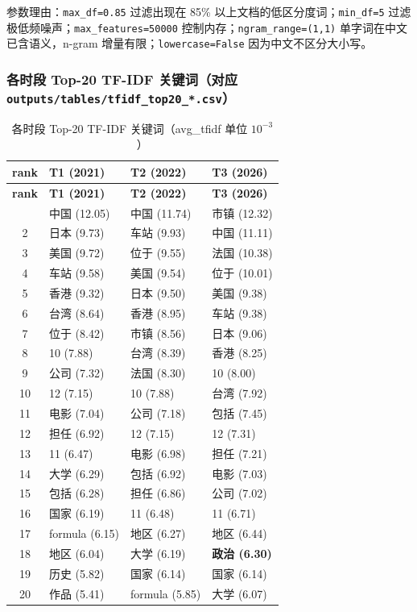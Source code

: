 \documentclass[12pt,a4paper]{article}
\begin{document}
参数理由：\texttt{max\_df=0.85} 过滤出现在 85\% 以上文档的低区分度词；\texttt{min\_df=5} 过滤极低频噪声；\texttt{max\_features=50000} 控制内存；\texttt{ngram\_range=(1,1)} 单字词在中文已含语义，n-gram 增量有限；\texttt{lowercase=False} 因为中文不区分大小写。

\subsubsection*{各时段 Top-20 TF-IDF 关键词（对应 \texttt{outputs/tables/tfidf\_top20\_*.csv}）}

\begin{longtable}{|c|l|l|l|}
\caption{各时段 Top-20 TF-IDF 关键词（avg\_tfidf 单位 $10^{-3}$）} \\
\hline
\textbf{rank} & \textbf{T1 (2021)} & \textbf{T2 (2022)} & \textbf{T3 (2026)} \\
\hline
\endfirsthead
\hline
\textbf{rank} & \textbf{T1 (2021)} & \textbf{T2 (2022)} & \textbf{T3 (2026)} \\
\hline
\endhead
\hline
\endfoot
1  & 中国 (12.05) & 中国 (11.74) & 市镇 (12.32) \\
2  & 日本 (9.73)  & 车站 (9.93)  & 中国 (11.11) \\
3  & 美国 (9.72)  & 位于 (9.55)  & 法国 (10.38) \\
4  & 车站 (9.58)  & 美国 (9.54)  & 位于 (10.01) \\
5  & 香港 (9.32)  & 日本 (9.50)  & 美国 (9.38) \\
6  & 台湾 (8.64)  & 香港 (8.95)  & 车站 (9.38) \\
7  & 位于 (8.42)  & 市镇 (8.56)  & 日本 (9.06) \\
8  & 10 (7.88)    & 台湾 (8.39)  & 香港 (8.25) \\
9  & 公司 (7.32)  & 法国 (8.30)  & 10 (8.00) \\
10 & 12 (7.15)    & 10 (7.88)    & 台湾 (7.92) \\
11 & 电影 (7.04)  & 公司 (7.18)  & 包括 (7.45) \\
12 & 担任 (6.92)  & 12 (7.15)    & 12 (7.31) \\
13 & 11 (6.47)    & 电影 (6.98)  & 担任 (7.21) \\
14 & 大学 (6.29)  & 包括 (6.92)  & 电影 (7.03) \\
15 & 包括 (6.28)  & 担任 (6.86)  & 公司 (7.02) \\
16 & 国家 (6.19)  & 11 (6.48)    & 11 (6.71) \\
17 & formula (6.15)&地区 (6.27)  & 地区 (6.44) \\
18 & 地区 (6.04)  & 大学 (6.19)  & \textbf{政治 (6.30)} \\
19 & 历史 (5.82)  & 国家 (6.14)  & 国家 (6.14) \\
20 & 作品 (5.41)  & formula (5.85)& 大学 (6.07) \\
\end{longtable}
\end{document}
